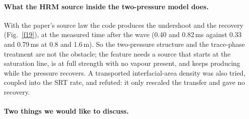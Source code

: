 \documentclass[11pt,a4paper]{article}
\begin{document}
\paragraph{What the HRM source inside the two-pressure model does.} With the paper's source law the code produces the undershoot and the recovery (Fig.~\ref{f19}), at the measured time after the wave (0.40 and 0.82\,ms against 0.33 and 0.79\,ms at 0.8 and 1.6\,m). So the two-pressure structure and the trace-phase treatment are not the obstacle; the feature needs a source that starts at the saturation line, is at full strength with no vapour present, and keeps producing while the pressure recovers. A transported interfacial-area density was also tried, coupled into the SRT rate, and refuted: it only rescaled the transfer and gave no recovery.

\paragraph{Two things we would like to discuss.}
\end{document}
